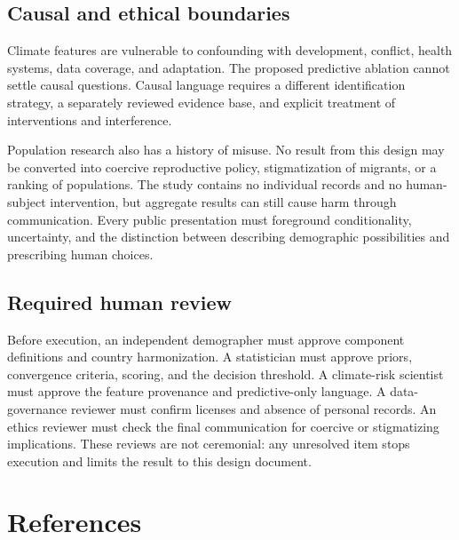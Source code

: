 \documentclass[conference]{IEEEtran}
\begin{document}
\subsection{Causal and ethical boundaries}

Climate features are vulnerable to confounding with development, conflict, health systems, data coverage, and adaptation. The proposed predictive ablation cannot settle causal questions. Causal language requires a different identification strategy, a separately reviewed evidence base, and explicit treatment of interventions and interference.

Population research also has a history of misuse. No result from this design may be converted into coercive reproductive policy, stigmatization of migrants, or a ranking of populations. The study contains no individual records and no human-subject intervention, but aggregate results can still cause harm through communication. Every public presentation must foreground conditionality, uncertainty, and the distinction between describing demographic possibilities and prescribing human choices.

\subsection{Required human review}

Before execution, an independent demographer must approve component definitions and country harmonization. A statistician must approve priors, convergence criteria, scoring, and the decision threshold. A climate-risk scientist must approve the feature provenance and predictive-only language. A data-governance reviewer must confirm licenses and absence of personal records. An ethics reviewer must check the final communication for coercive or stigmatizing implications. These reviews are not ceremonial: any unresolved item stops execution and limits the result to this design document.

\section{References}
\end{document}
